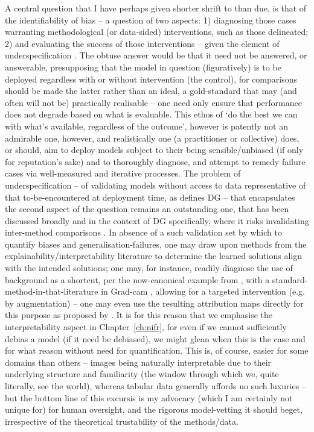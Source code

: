%
A central question that I have perhaps given shorter shrift to than due, is that of the
identifiability of bias -- a question of two aspects: 1) diagnosing those cases warranting
methodological (or data-sided) interventions, such as those delineated; 2) and evaluating the
success of those interventions -- given the element of underspecification
\citep{semenova2019study}.
%
The obtuse answer would be that it need not be answered, or answerable, presupposing that the model
in question (figuratively) is to be deployed regardless with or without intervention (the control),
for comparisons should be made \wrt{} the latter rather than \wrt{} an ideal, a gold-standard that
may (and often will not be) practically realisable -- one need only ensure that performance does
not degrade based on what is evaluable.
%
%
This ethos of `do the best we can with what's available, regardless of the outcome', however is
patently not an admirable one, however, and realistically one (a practitioner or collective) does,
or should, aim to deploy models subject to their being sensible/unbiased (if only for reputation's
sake) and to thoroughly diagnose, and attempt to remedy failure cases via well-measured and
iterative processes.
%
The problem of underspecification -- of validating models without access to data representative of
that to-be-encountered at deployment time, as defines \ac{DG} -- that encapsulates the second
aspect of the question remains an outstanding one, that has been discussed broadly and in the
context of \ac{DG} specifically, where it risks invalidating inter-method comparisons
\citep{gulrajani2020search}.
%
%
In absence of a such validation set by which to quantify biases and generalisation-failures, one
may draw upon methods from the explainability/interpretability literature \citep{gunning2019xai} to
determine the learned solutions align with the intended solutions; one may, for instance, readily
diagnose the use of background as a shortcut, per the now-canonical example from
\cite{beery2018recognition}, with a standard-method-in-that-literature in Grad-cam
\cite{selvaraju2017grad}, allowing for a targeted intervention (e.g. by augmentation) -- one may
even use the resulting attribution maps directly for this purpose as proposed by
\cite{taghanaki2022masktune}.
%
It is for this reason that we emphasise the interpretability aspect in Chapter~\ref{ch:nifr}, for
even if we cannot sufficiently debias a model (if it need be debiased), we might glean when this is
the case and for what reason without need for quantification.
%
This is, of course, easier for some domains than others -- images being naturally interpretable due
to their underlying structure and familiarity (the window through which we, quite literally, see
the world), whereas tabular data generally affords no such luxuries -- but the bottom line of this
excursis is my advocacy (which I am certainly not unique for) for human oversight, and the rigorous
model-vetting it should beget, irrespective of the theoretical trustability of the methods/data.
 

